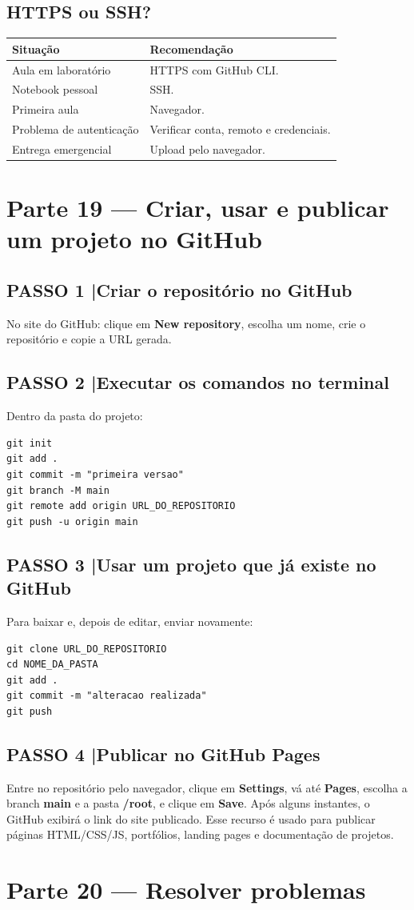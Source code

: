 \documentclass[11pt,a4paper]{article}
\renewcommand{\arraystretch}{1.18}
\newcommand{\passo}[2]{\subsection*{PASSO #1 \quad|\quad #2}}
\begin{document}
\subsection*{HTTPS ou SSH?}
\begin{center}\small
\renewcommand{\arraystretch}{1.35}
\begin{tabular}{|p{4.6cm}|p{8.6cm}|}\hline
\rowcolor{azulclaro}\textbf{Situação} & \textbf{Recomendação} \\ \hline
Aula em laboratório & HTTPS com GitHub CLI. \\ \hline
Notebook pessoal & SSH. \\ \hline
Primeira aula & Navegador. \\ \hline
Problema de autenticação & Verificar conta, remoto e credenciais. \\ \hline
Entrega emergencial & Upload pelo navegador. \\ \hline
\end{tabular}
\end{center}

\section*{Parte 19 --- Criar, usar e publicar um projeto no GitHub}
\passo{1}{Criar o repositório no GitHub}
No site do GitHub: clique em \textbf{New repository}, escolha um nome, crie o repositório e copie a URL gerada.
\passo{2}{Executar os comandos no terminal}
Dentro da pasta do projeto:
\begin{lstlisting}
git init
git add .
git commit -m "primeira versao"
git branch -M main
git remote add origin URL_DO_REPOSITORIO
git push -u origin main
\end{lstlisting}
\passo{3}{Usar um projeto que já existe no GitHub}
Para baixar e, depois de editar, enviar novamente:
\begin{lstlisting}
git clone URL_DO_REPOSITORIO
cd NOME_DA_PASTA
git add .
git commit -m "alteracao realizada"
git push
\end{lstlisting}
\passo{4}{Publicar no GitHub Pages}
Entre no repositório pelo navegador, clique em \textbf{Settings}, vá até \textbf{Pages}, escolha a branch \textbf{main} e a pasta \textbf{/root}, e clique em \textbf{Save}. Após alguns instantes, o GitHub exibirá o link do site publicado. Esse recurso é usado para publicar páginas HTML/CSS/JS, portfólios, landing pages e documentação de projetos.

\section*{Parte 20 --- Resolver problemas}
\end{document}
